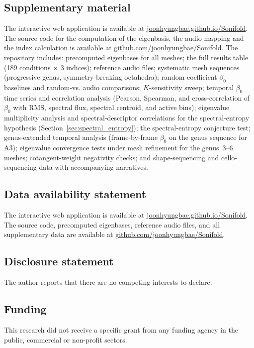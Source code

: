 \documentclass[]{interact}
\theoremstyle{plain}
\theoremstyle{definition}
\theoremstyle{remark}
\begin{document}
\subsection*{Supplementary material}
The interactive web application is available at \href{https://joonhyungbae.github.io/Sonifold/}{joonhyungbae.github.io/Sonifold}.
The source code for the computation of the eigenbasis, the audio mapping and the index calculation is available at \href{https://github.com/joonhyungbae/Sonifold}{github.com/joonhyungbae/Sonifold}.
The repository includes: precomputed eigenbases for all meshes; the full results table (189 conditions $\times$ 3 indices); reference audio files; systematic mesh sequences (progressive genus, symmetry-breaking octahedra); random-coefficient $\beta_0$ baselines and random-vs. audio comparisons; $K$-sensitivity sweep; temporal $\beta_0$ time series and correlation analysis (Pearson, Spearman, and cross-correlation of $\beta_0$ with RMS, spectral flux, spectral centroid, and active bins); eigenvalue multiplicity analysis and spectral-descriptor correlations for the spectral-entropy hypothesis (Section~\ref{sec:spectral_entropy}); the spectral-entropy conjecture test; genus-extended temporal analysis (frame-by-frame $\beta_0$ on the genus sequence for A3); eigenvalue convergence tests under mesh refinement for the genus~3--6 meshes; cotangent-weight negativity checks; and shape-sequencing and cello-sequencing data with accompanying narratives.

\subsection*{Data availability statement}
The interactive web application is available at \href{https://joonhyungbae.github.io/Sonifold/}{joonhyungbae.github.io/Sonifold}.
The source code, precomputed eigenbases, reference audio files, and all supplementary data are available at \href{https://github.com/joonhyungbae/Sonifold}{github.com/joonhyungbae/Sonifold}.

\subsection*{Disclosure statement}
The author reports that there are no competing interests to declare.

\subsection*{Funding}
This research did not receive a specific grant from any funding agency in the public, commercial or non-profit sectors.



\end{document}
